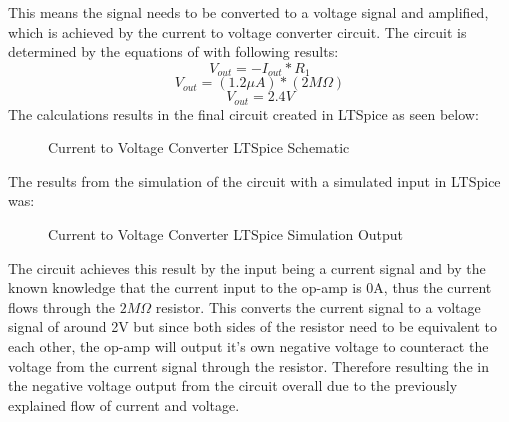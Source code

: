 \documentclass{article}
\begin{document}
This means the signal needs to be converted to a voltage signal and amplified, which is achieved by the current to voltage converter circuit. The circuit is determined by the equations of with following results:
\begin{equation}
     V_{out} = -I_{out}*R_{1}
\end{equation}
\begin{equation}
    V_{out} = (1.2\mu A)*(2M\Omega)
\end{equation}
\begin{equation}
    V_{out} = 2.4V
\end{equation}
The calculations results in the final circuit created in LTSpice as seen below:
\begin{figure}[h]
    \centering
    \caption{Current to Voltage Converter LTSpice Schematic}
    \label{figure:CtoVLTSpice}
\end{figure}
\newpage
The results from the simulation of the circuit with a simulated input in LTSpice was:
\begin{figure}[h]
    \centering
    \caption{Current to Voltage Converter LTSpice Simulation Output}
    \label{figure:CtoVLTSpice_O}
\end{figure}

The circuit achieves this result by the input being a current signal and by the known knowledge that the current input to the op-amp is 0A, thus the current flows through the $2M\Omega$ resistor. This converts the current signal to a voltage signal of around 2V but since both sides of the resistor need to be equivalent to each other, the op-amp will output it's own negative voltage to counteract the voltage from the current signal through the resistor. Therefore resulting the in the negative voltage output from the circuit overall due to the previously explained flow of current and voltage.
\end{document}
